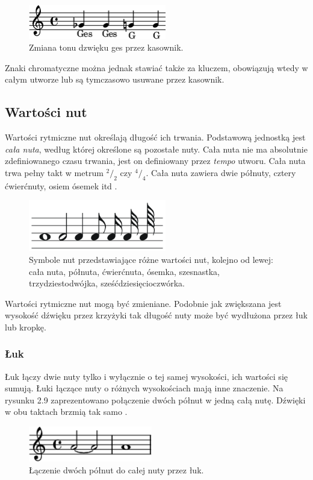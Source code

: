 \documentclass[printmode, eng]{mgr}
\newcommand\tab[1][1cm]{\hspace*{#1}}
\newcommand*\rfrac[2]{{}^{#1}\!/_{#2}}
\begin{document}
\begin{figure}[!htb]
\centering
\includegraphics[width=6cm]{kasownik_poj}
\caption{Zmiana tonu dzwięku ges przez kasownik.}
\end{figure}

\tab Znaki chromatyczne można jednak stawiać także za kluczem, obowiązują wtedy w całym utworze lub są tymczasowo usuwane przez kasownik.

\subsection{Wartości nut}
\tab Wartości rytmiczne nut określają długość ich trwania. Podstawową jednostką jest \textit{cała nuta}, według której określone są pozostałe nuty. Cała nuta nie ma absolutnie zdefiniowanego czasu trwania, jest on definiowany przez \textit{tempo} utworu. Cała nuta trwa pełny takt w metrum $\rfrac{2}{2}$ czy $\rfrac{4}{4}$. Cała nuta zawiera dwie półnuty, cztery ćwierćnuty, osiem ósemek itd \cite{wart}. 

\begin{figure}[H]
\centering
\includegraphics[width=6cm]{wartosci_nut}
\caption{Symbole nut przedstawiające różne wartości nut, kolejno od lewej: cała nuta, półnuta, ćwierćnuta, ósemka, szesnastka, trzydziestodwójka, sześćdziesięcioczwórka.}
\end{figure}
\tab Wartości rytmiczne nut mogą być zmieniane. Podobnie jak zwiększana jest wysokość dźwięku przez krzyżyki tak długość nuty może być wydłużona przez łuk lub kropkę. 
\subsubsection{Łuk}
\tab Łuk łączy dwie nuty tylko i wyłącznie o tej samej wysokości, ich wartości się sumują. Łuki łączące nuty o różnych wysokościach mają inne znaczenie. Na rysunku 2.9 zaprezentowano połączenie dwóch półnut w jedną całą nutę. Dźwięki w obu taktach brzmią tak samo \cite{wart}.

\begin{figure}[!htb]
\centering
\includegraphics[width=5.4cm]{luk}
\caption{Łączenie dwóch półnut do całej nuty przez łuk.}
\end{figure}
\end{document}
